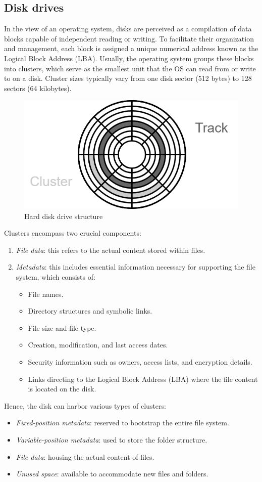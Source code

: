 \subsection{Disk drives}
In the view of an operating system, disks are perceived as a compilation of data blocks capable of independent reading or writing. 
To facilitate their organization and management, each block is assigned a unique numerical address known as the Logical Block Address (LBA). 
Usually, the operating system groups these blocks into clusters, which serve as the smallest unit that the OS can read from or write to on a disk. 
Cluster sizes typically vary from one disk sector (512 bytes) to 128 sectors (64 kilobytes).
\begin{figure}[H]
    \centering
    \includegraphics[width=0.5\linewidth]{images/hdd.png}
    \caption{Hard disk drive structure}
\end{figure}
Clusters encompass two crucial components:
\begin{enumerate}
    \item \textit{File data}: this refers to the actual content stored within files.
    \item \textit{Metadata}: this includes essential information necessary for supporting the file system, which consists of:
        \begin{itemize}
            \item File names.
            \item Directory structures and symbolic links.
            \item File size and file type.
            \item Creation, modification, and last access dates.
            \item Security information such as owners, access lists, and encryption details.
            \item Links directing to the Logical Block Address (LBA) where the file content is located on the disk.
        \end{itemize}
\end{enumerate}
Hence, the disk can harbor various types of clusters:
\begin{itemize}
    \item \textit{Fixed-position metadata}: reserved to bootstrap the entire file system.
    \item \textit{Variable-position metadata}: used to store the folder structure.
    \item \textit{File data}: housing the actual content of files.
    \item \textit{Unused space}: available to accommodate new files and folders.
\end{itemize}

